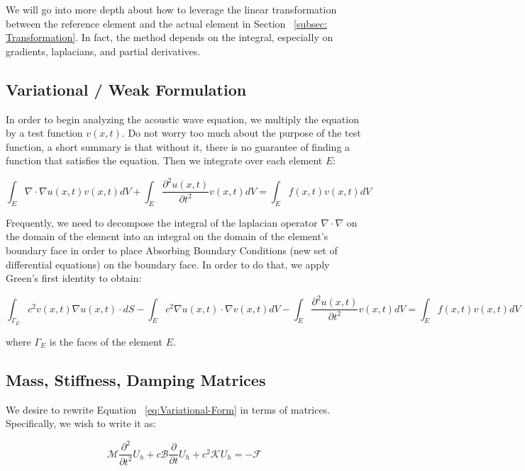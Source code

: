 We will go into more depth about how to leverage the linear transformation between the reference element and the actual element in Section ~\ref{subsec: Transformation}. In fact, the method depends on the integral, especially on gradients, laplacians, and partial derivatives.

\subsection{Variational / Weak Formulation}

In order to begin analyzing the acoustic wave equation, we multiply the equation by a test function $v(x,t)$. Do not worry too much about the purpose of the test function, a short summary is that without it, there is no guarantee of finding a function that satisfies the equation. Then we integrate over each element $E$:

\begin{equation} 
\int_E \nabla \cdot \nabla u(x,t) v(x,t) dV + \int_E \frac{\partial^2 u(x,t)}{\partial t^2} v(x,t) dV = \int_E f(x,t) v(x,t) dV 
\end{equation}

Frequently, we need to decompose the integral of the laplacian operator $\nabla \cdot \nabla$ on the domain of the element into an integral on the domain of the element's boundary face in order to place Absorbing Boundary Conditions (new set of differential equations) on the boundary face. In order to do that, we apply Green's first identity to obtain:

\begin{equation}
\int_{\Gamma_E} c^2 v(x,t) \nabla u(x,t) \cdot dS - \int_E c^2 \nabla u(x,t) \cdot \nabla v(x,t) dV - \int_E \frac{\partial^2 u(x,t)}{\partial t^2} v(x,t) dV = \int_E f(x,t) v(x,t) dV
\label{eq:Variational-Form}
\end{equation}

where $\Gamma_E$ is the faces of the element $E$.

\subsection{Mass, Stiffness, Damping Matrices}

We desire to rewrite Equation ~\ref{eq:Variational-Form} in terms of matrices. Specifically, we wish to write it as:

\begin{equation}
\mathcal{M} \frac{\partial^2}{\partial t^2} U_h + c \mathcal{B} \frac{\partial}{\partial t} U_h + c^2 \mathcal{K} U_h = -\mathcal{F}
\label{eq:Matrix-Form}
\end{equation}


